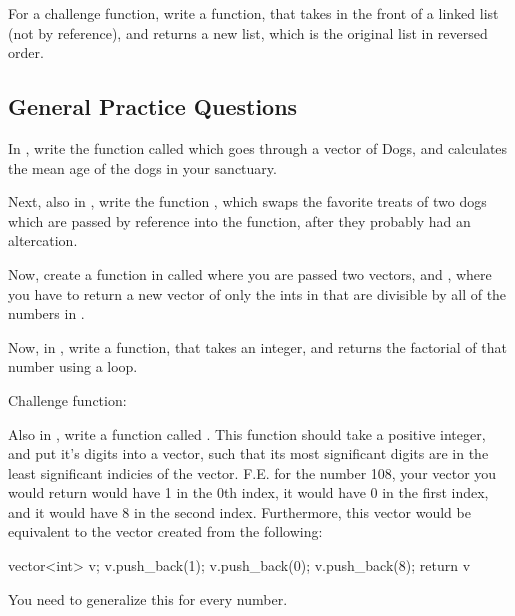\documentclass{tufte-handout}
\begin{document}
For a  challenge function, write a function,  that takes in the front of a linked list (not by reference), and returns a new list, which is the original list in reversed order.  

\subsection{General Practice Questions}

In , write the function called  which goes through a vector of Dogs, and calculates the mean age of the dogs in your sanctuary.

Next, also in , write the function , which swaps the favorite treats of two dogs which are passed by reference into the function, after they probably had an altercation.

Now, create a function in  called  where you are passed two vectors,  and , where you have to return a new vector of only the ints in  that are divisible by all of the numbers in .

Now, in , write a function,  that takes an integer, and returns the factorial of that number using a loop.  

Challenge function: 

Also in , write a function called .
This function should take a positive integer, and put it's digits into a vector, such that its most significant digits are in the least significant indicies of the vector.
F.E. for the number 108, your vector you would return would have 1 in the 0th index, it would have 0 in the first index, and it would have 8 in the second index.
Furthermore, this vector would be equivalent to the vector created from the following:
\begin{Code}
vector<int> v;
v.push_back(1);
v.push_back(0);
v.push_back(8);
return v
\end{Code}
You need to generalize this for every number.
\end{document}
